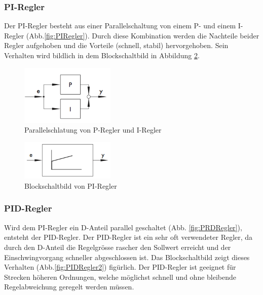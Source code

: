\subsubsection{PI-Regler}
Der PI-Regler besteht aus einer Parallelschaltung von einem P- und einem I-Regler (Abb.\ref{fig:PIRegler}). Durch diese Kombination werden die Nachteile beider Regler aufgehoben und die Vorteile (schnell, stabil) hervorgehoben. Sein Verhalten wird bildlich in dem Blockschaltbild in Abbildung \ref{fig:PIRegler2}.\\

\begin{figure}[h!, width=\pagewidth]
\begin{center}
\includegraphics[width=0.4\textwidth]{images/PIRegler1}
\caption{Parallelschlatung von P-Regler und I-Regler}
\label{fig:PIRegler1}
\end{center}
\end{figure}

\begin{figure}[h!, width=\pagewidth]
\begin{center}
\includegraphics[width=0.4\textwidth]{images/PIRegler2}
\caption{Blockschaltbild von PI-Regler}
\label{fig:PIRegler2}
\end{center}
\end{figure}


\subsubsection{PID-Regler}
Wird dem PI-Regler ein D-Anteil parallel geschaltet (Abb. \ref{fig:PRDRegler}), entsteht der PID-Regler. Der PID-Regler ist ein sehr oft verwendeter Regler, da durch den D-Anteil die Regelgrösse rascher den Sollwert erreicht und der Einschwingvorgang schneller abgeschlossen ist. Das Blockschaltbild zeigt dieses Verhalten (Abb.\ref{fig:PIDRegler2}) figürlich. Der PID-Regler ist geeignet für Strecken höheren Ordnungen, welche möglichst schnell und ohne bleibende Regelabweichung geregelt werden müssen.


